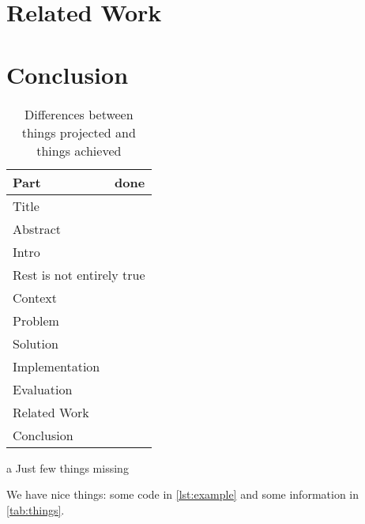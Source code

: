 \section{Related Work}
\label{sec:related-work}

\section{Conclusion}
\label{sec:conclusion}

\begin{table}
  \centering
  \tableinsidecommand
  \begin{threeparttable}
    \caption{Differences between things projected and things achieved}
    \label{tab:things}
    \begin{tabular}{>{}p{.4\linewidth}@{}c} \toprule
      Part           & done        \\ \midrule
      Title          & \y          \\
      Abstract       & \n          \\
      Intro          & \y          \\
      \multicolumn{2}{c}{Rest is not entirely true} \\ \midrule
      Context        & \y          \\
      Problem        & \n\tnote{a} \\
      Solution       & \y          \\
      Implementation & \y          \\
      Evaluation     & \n          \\
      Related Work   & \n          \\
      Conclusion     & \y          \\ \bottomrule
    \end{tabular}
    \begin{tablenotes}
      \item [a] Just few things missing
    \end{tablenotes}
  \end{threeparttable}
\end{table}

We have nice things: some code in \autoref{lst:example} and some information
in \autoref{tab:things}.



\nocite{*}



